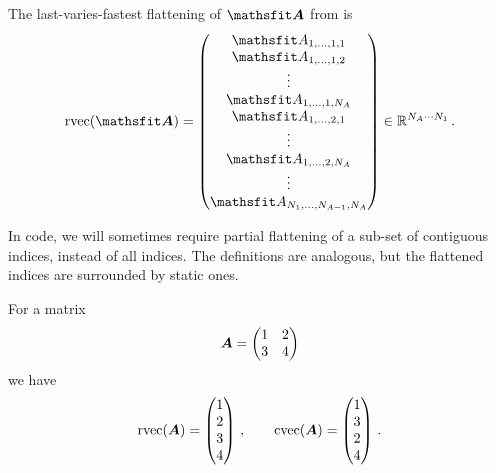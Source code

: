 \begin{definition}\label{def:rvec}
  The last-varies-fastest flattening of $\tA$ from  is
  \begin{align*}
    \rvec(\tA) =
    \begin{pmatrix}
      \etA_{1,\dots,1,1} \\
      \etA_{1,\dots,1,2} \\
      \vdots \\
      \etA_{1,\dots,1,N_A} \\
      \etA_{1,\dots,2,1} \\
      \vdots \\
      \etA_{1,\dots,2,N_A} \\
      \vdots \\
      \etA_{N_1,\dots,N_{A-1},N_A}
    \end{pmatrix}
    \in \sR ^{N_A \cdots N_1}\,.
  \end{align*}
\end{definition}

In code, we will sometimes require partial flattening of a sub-set of contiguous indices, instead of all indices.
The definitions are analogous, but the flattened indices are surrounded by static ones.

\begin{example}\label{ex:flattening}
  For a matrix
  \begin{equation*}
    {\bm{A}} = \begin{pmatrix} 1 & 2 \\ 3 & 4 \end{pmatrix}
  \end{equation*}
  we have
  \begin{equation*}
    \operatorname{rvec}({\bm{A}})
    =
    \begin{pmatrix}
      1 \\ 2 \\ 3 \\ 4
    \end{pmatrix}\,,
    \qquad
    \operatorname{cvec}({\bm{A}})
    =
    \begin{pmatrix}
      1 \\ 3 \\ 2 \\ 4
    \end{pmatrix}\,.
  \end{equation*}
\end{example}

